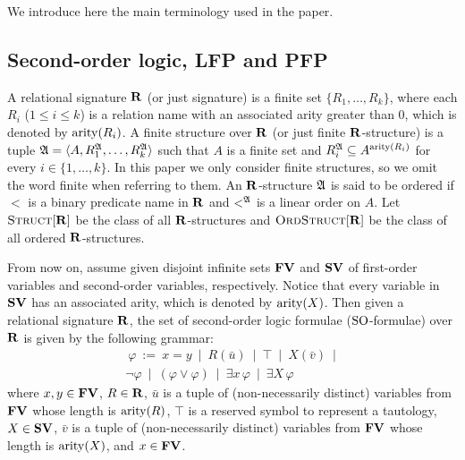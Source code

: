 
We introduce here the main terminology used in the paper.

\subsection{Second-order logic, LFP and PFP}
A relational signature $\mathbf{R}$ (or just signature) is a finite set $\{R_1, \ldots, R_k\}$, where each $R_i$ ($1 \leq i \leq k$) is a relation name with an associated arity greater than 0, which is denoted by ${\rm arity}(R_i)$. A finite structure over $\mathbf{R}$ (or just finite $\mathbf{R}$-structure) is a tuple $\mathfrak{A} = \langle A, R_1^{\mathfrak{A}}, \ldots, R_k^{\mathfrak{A}} \rangle$ such that $A$ is a finite set and $R_i^{\mathfrak{A}} \subseteq A^{{\rm arity}(R_i)}$ for every $i \in \{1, \ldots, k\}$. In this paper we only consider finite structures, so we omit the word finite when referring to them. An $\mathbf{R}$-structure $\mathfrak{A}$ is said to be ordered if $<$ is a binary predicate name in $\mathbf{R}$ and $<^{\mathfrak{A}}$ is a linear order on $A$. Let $\text{\sc Struct}[\mathbf{R}]$ be the class of all $\mathbf{R}$-structures and $\text{\sc OrdStruct}[\mathbf{R}]$ be the class of all ordered $\mathbf{R}$-structures. 

From now on, assume given disjoint infinite sets $\mathbf{FV}$ and $\mathbf{SV}$ of first-order variables and second-order variables, respectively. Notice that every variable in $\mathbf{SV}$ has an associated arity, which is denoted by ${\rm arity}(X)$. Then given a relational signature $\mathbf{R}$, the set of second-order logic formulae (${\rm SO}$-formulae) over $\mathbf{R}$ is given by the following grammar:
\begin{multline*}\ 
	\varphi \ := \ x = y \ \mid \ R(\bar u) \ \mid \ \top  \ \mid\  
	X(\bar v)  \ \mid\\ 
	\neg \varphi \ \mid\ 
	(\varphi \vee \varphi) \ \mid\ 
	\exists x \, \varphi \ \mid\ 
	\exists X \, \varphi
\end{multline*}
where $x,y \in \mathbf{FV}$, $R \in \mathbf{R}$, $\bar u$ is a tuple of (non-necessarily distinct) variables from $\mathbf{FV}$ whose length is ${\rm arity}(R)$, $\top$ is a reserved symbol to represent a tautology, $X \in \mathbf{SV}$, $\bar v$ is a tuple of (non-necessarily distinct) variables from $\mathbf{FV}$ whose length is ${\rm arity}(X)$, and $x \in \mathbf{FV}$. 



